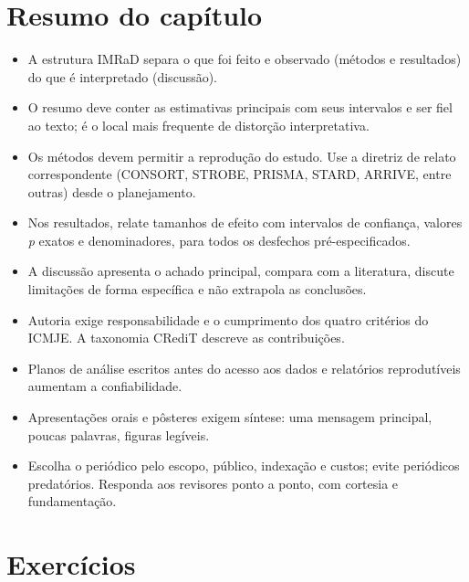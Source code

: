 \documentclass[
]{book}
\providecommand{\tightlist}{%
  \setlength{\itemsep}{0pt}\setlength{\parskip}{0pt}}
\begin{document}
\section{Resumo do capítulo}\label{resumo-do-capuxedtulo-6}

\begin{itemize}
\tightlist
\item
  A estrutura IMRaD separa o que foi feito e observado (métodos e resultados) do que é interpretado (discussão).
\item
  O resumo deve conter as estimativas principais com seus intervalos e ser fiel ao texto; é o local mais frequente de distorção interpretativa.
\item
  Os métodos devem permitir a reprodução do estudo. Use a diretriz de relato correspondente (CONSORT, STROBE, PRISMA, STARD, ARRIVE, entre outras) desde o planejamento.
\item
  Nos resultados, relate tamanhos de efeito com intervalos de confiança, valores \emph{p} exatos e denominadores, para todos os desfechos pré-especificados.
\item
  A discussão apresenta o achado principal, compara com a literatura, discute limitações de forma específica e não extrapola as conclusões.
\item
  Autoria exige responsabilidade e o cumprimento dos quatro critérios do ICMJE. A taxonomia CRediT descreve as contribuições.
\item
  Planos de análise escritos antes do acesso aos dados e relatórios reprodutíveis aumentam a confiabilidade.
\item
  Apresentações orais e pôsteres exigem síntese: uma mensagem principal, poucas palavras, figuras legíveis.
\item
  Escolha o periódico pelo escopo, público, indexação e custos; evite periódicos predatórios. Responda aos revisores ponto a ponto, com cortesia e fundamentação.
\end{itemize}

\section{Exercícios}\label{exercuxedcios-6}
\end{document}
